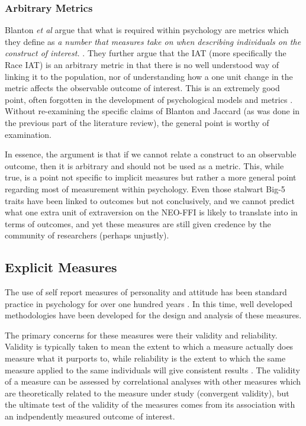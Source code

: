 \subsubsection{Arbitrary Metrics}
\label{sec:arbitrary-metrics}


Blanton \textit{et al} argue that what is required within psychology are metrics which they define as \textit{a number that measures take on when describing individuals on the construct of interest. } \cite{Blanton2006d}. They further argue that the IAT (more specifically the Race IAT) is an arbitrary metric in that there is no well understood way of linking it to the population, nor of understanding how a one unit change in the metric affects the observable outcome of interest. This is an extremely good point, often forgotten in the development of psychological models and metrics \cite{borsboom2006attack}. Without re-examining the specific claims of Blanton and Jaccard (as was done in the previous part of the literature review), the general point is worthy of examination. 

In essence, the argument is that if we cannot relate a construct to an observable outcome, then it is arbitrary and should not be used as a metric. This, while true, is a point not specific to implicit measures but rather a more general point regarding most of measurement within psychology. Even those stalwart Big-5 traits have been linked to outcomes but not conclusively, and we cannot predict what one extra unit of extraversion on the NEO-FFI is likely to translate into in terms of outcomes, and yet these measures are still given credence by the community of researchers (perhaps unjustly). 



\subsection{Explicit Measures}
\label{sec:explicit-measures}
The use of self report measures of personality and attitude has been standard practice in psychology for over one hundred years \cite{spearman1904general}. In this time, well developed methodologies have been developed for the design and analysis of these measures.

The primary concerns for these measures were their validity and reliability. Validity is typically taken to mean the extent to which a measure actually does measure what it purports to, while reliability is the extent to which the same measure applied to the same individuals will give consistent results \cite{raykov2010introduction}.  The validity of a measure can be assessed by correlational analyses with other measures which are theoretically related to the measure under study (convergent validity), but the ultimate test of the validity of the measures comes from its association with an indpendently measured outcome of interest. 

